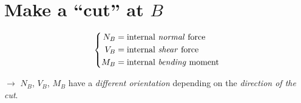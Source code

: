 \documentclass[11pt]{article}
\begin{document}
\section*{\protect{} Make a ``cut'' at $B$}

\noindent
\begin{minipage}[c]{0.5\textwidth}
\centering
{}
\end{minipage}%
\hfill
\begin{minipage}[c]{0.47\textwidth}
\[
  \left\{
  \begin{aligned}
    N_B &= \text{internal \emph{normal} force} \\
    V_B &= \text{internal \emph{shear} force} \\
    M_B &= \text{internal \emph{bending} moment}
  \end{aligned}
  \right.
\]
\end{minipage}

\medskip
\noindent
$\rightarrow$ $N_B$, $V_B$, $M_B$ have a \emph{different orientation} depending on the
\emph{direction of the cut}.
\end{document}
